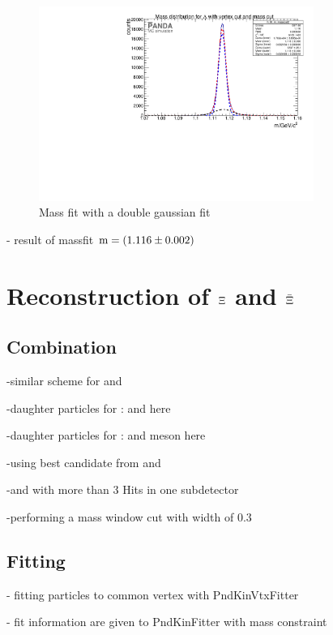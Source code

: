 		\begin{figure}
			\centering
				\includegraphics[width=0.8\textwidth]{./plots/lambda0/lambda0_m_masscut2.pdf}
			\caption{Mass fit with a double gaussian fit}
			\label{fig:lambda0_massfit}
		\end{figure}
		
		- result of massfit $\textnormal{m} = \left(1.116 \pm 0.002\right)$ \massunit
	
\section{Reconstruction of $\boldmath{\Xi}$ and $\boldmath{\bar{\Xi}}$}
	\subsection{Combination}
	
		-similar scheme for \lam and \alam
		
		-daughter particles for \anticascade: \antiproton and \piplus here \piplusone
		
		-daughter particles for \cascade:  \lam and \piminus meson here \piplusone
		
		-using best candidate from \lam and \alam
		
		-\piplus and \piminus with more than 3 Hits in one subdetector 
		
		-performing a mass window cut with width of $0.3$\massunit 
		
		
	\subsection{Fitting}
	
		- fitting particles to common vertex with PndKinVtxFitter
		
		- fit information are given to PndKinFitter with mass constraint
		
